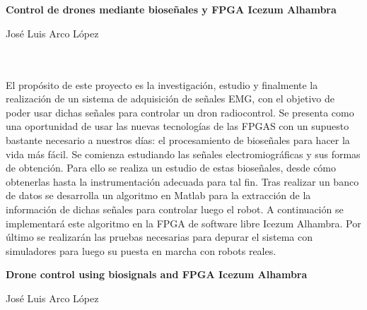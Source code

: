 \chapter*{}






\cleardoublepage
\thispagestyle{empty}

\begin{center}
{\large\bfseries Control de drones mediante bioseñales y FPGA Icezum Alhambra }\\
\end{center}
\begin{center}
José Luis Arco López\\
\end{center}

\\

\vspace{0.7cm}
\\

El propósito de este proyecto es la investigación, estudio y finalmente la realización de un sistema de adquisición de señales EMG, con el objetivo de poder usar dichas señales para controlar un dron radiocontrol.  Se presenta como una oportunidad de usar las nuevas tecnologías de las FPGAS con un supuesto bastante necesario a nuestros días: el procesamiento de bioseñales para hacer la vida más fácil. Se comienza estudiando las señales electromiográficas y sus formas de obtención. Para ello se realiza un estudio de estas bioseñales, desde cómo obtenerlas hasta la instrumentación adecuada para tal fin. Tras realizar un banco de datos se desarrolla un algoritmo en Matlab para la extracción de la información de dichas señales para controlar luego el robot. A continuación se implementará este algoritmo en la FPGA de software libre Icezum Alhambra. Por último se realizarán las pruebas necesarias para depurar el sistema con simuladores para luego su puesta en marcha con robots reales.

\cleardoublepage


\thispagestyle{empty}


\begin{center}
{\large\bfseries 
Drone control using biosignals and FPGA Icezum Alhambra}\\
\end{center}
\begin{center}
José Luis Arco López\\
\end{center}

